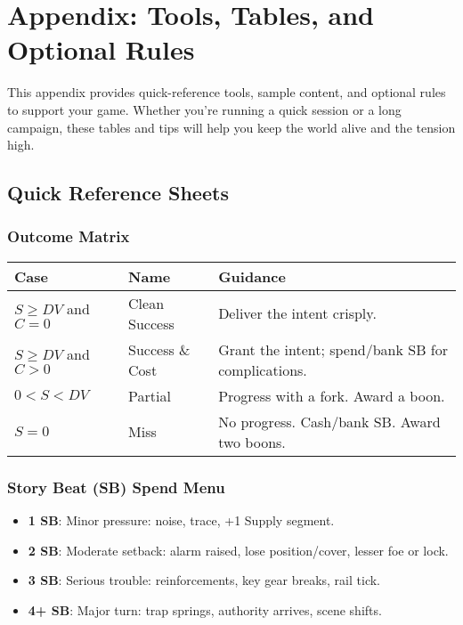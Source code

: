 \chapter{Appendix: Tools, Tables, and Optional Rules}

This appendix provides quick-reference tools, sample content, and optional rules to support your game. Whether you're running a quick session or a long campaign, these tables and tips will help you keep the world alive and the tension high.

\section*{Quick Reference Sheets}

\subsection*{Outcome Matrix}

\begin{center}
\begin{tabular}{lll}
\toprule
\textbf{Case} & \textbf{Name} & \textbf{Guidance} \\
\midrule
$S \geq DV$ and $C = 0$ & Clean Success\index{Clean Success} & Deliver the intent crisply. \\
$S \geq DV$ and $C > 0$ & Success \& Cost\index{Success \& Cost} & Grant the intent; spend/bank SB for complications. \\
$0 < S < DV$ & Partial\index{Partial} & Progress with a fork. Award a boon. \\
$S = 0$ & Miss\index{Miss} & No progress. Cash/bank SB. Award two boons. \\
\bottomrule
\end{tabular}
\end{center}

\subsection*{Story Beat (SB) Spend Menu}

\begin{itemize}
    \item \textbf{1 SB}: Minor pressure: noise, trace, +1 Supply segment.
    \item \textbf{2 SB}: Moderate setback: alarm raised, lose position/cover, lesser foe or lock.
    \item \textbf{3 SB}: Serious trouble: reinforcements, key gear breaks, rail tick.
    \item \textbf{4+ SB}: Major turn: trap springs, authority arrives, scene shifts.
\end{itemize}

